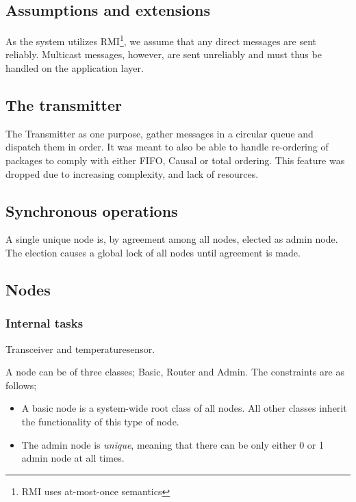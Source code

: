 \documentclass[10pt,a4paper]{article}
\begin{document}
\subsection{Assumptions and extensions}
As the system utilizes RMI\footnote{RMI uses at-most-once semantics}, we assume that any direct messages are sent reliably. Multicast messages, however, are sent unreliably and must thus be handled on the application layer.\\


\subsection{The transmitter}
The Transmitter as one purpose, gather messages in a circular queue and dispatch them in order. It was meant to also be able to handle re-ordering of packages to comply with either FIFO, Causal or total ordering. This feature was dropped due to increasing complexity, and lack of resources.

\subsection{Synchronous operations}

A single unique node is, by agreement among all nodes, elected as admin node. The election causes a global lock of all nodes until agreement is made.
\subsection{Nodes}

\subsubsection{Internal tasks}
\label{sec:internal_tasks}
Transceiver and temperaturesensor.


A node can be of three classes; Basic, Router and Admin. The constraints are as follows;
\begin{itemize}
\item A basic node is a system-wide root class of all nodes. All other classes inherit the functionality of this type of node.
\item The admin node is \emph{unique}, meaning that there can be only either 0 or 1 admin node at all times.
\end{itemize}
\end{document}
